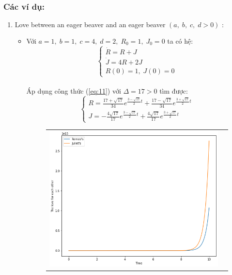 \documentclass[a4paper]{article}
\begin{document}
\subsubsection{Các ví dụ:}
\begin{enumerate}
\item Love between an eager beaver and an eager beaver $(a,\;b,\;c,\;d > 0)$ :
    \begin{itemize}
        \item Với $a = 1,\;b = 1,\;c = 4,\;d = 2,\;R_0 = 1,\;J_0 = 0$ ta có hệ: 
        $$\begin{cases} \dot{R}=R+J \\ \dot{J}=4R+2J \\ R(0)=1,\;J(0)=0 \end{cases}$$ \\
        Áp dụng công thức (\ref{eq:11}) với $\Delta = 17 > 0$ tìm được:
        $$\begin{cases}
            R = \frac{17+\sqrt{17}}{34} e^{\frac{3-\sqrt{17}}{2}t} + \frac{17-\sqrt{17}}{34} e^{\frac{3+\sqrt{17}}{2}t} \\[4pt]
            J = -\frac{4\sqrt{17}}{17} e^{\frac{3-\sqrt{17}}{2}t} + \frac{4\sqrt{17}}{17} e^{\frac{3+\sqrt{17}}{2}t}
        \end{cases}$$
        \begin{figure}[htp]
            \centering
            \begin{tabular}{c c}
                \includegraphics[scale = .33]{Images/Bt2/1.1_gr.png} & 

\end{tabular}
\end{figure}
\end{itemize}
\end{enumerate}
\end{document}
